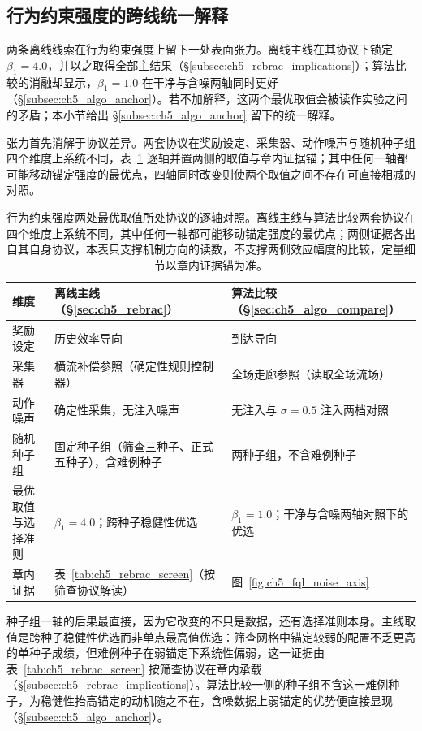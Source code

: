 \subsection{行为约束强度的跨线统一解释}\label{subsec:ch5_discussion_anchor}

两条离线线索在行为约束强度上留下一处表面张力。离线主线在其协议下锁定 $\beta_1=4.0$，并以之取得全部主结果（\S\ref{subsec:ch5_rebrac_implications}）；算法比较的消融却显示，$\beta_1=1.0$ 在干净与含噪两轴同时更好（\S\ref{subsec:ch5_algo_anchor}）。若不加解释，这两个最优取值会被读作实验之间的矛盾；本小节给出 \S\ref{subsec:ch5_algo_anchor} 留下的统一解释。

张力首先消解于协议差异。两套协议在奖励设定、采集器、动作噪声与随机种子组四个维度上系统不同，表~\ref{tab:ch5_discussion_beta_axes} 逐轴并置两侧的取值与章内证据锚；其中任何一轴都可能移动锚定强度的最优点，四轴同时改变则使两个取值之间不存在可直接相减的对照。

\begin{table}[t]
\centering
\caption{行为约束强度两处最优取值所处协议的逐轴对照。离线主线与算法比较两套协议在四个维度上系统不同，其中任何一轴都可能移动锚定强度的最优点；两侧证据各出自其自身协议，本表只支撑机制方向的读数，不支撑两侧效应幅度的比较，定量细节以章内证据锚为准。}
\label{tab:ch5_discussion_beta_axes}
\small
\setlength{\tabcolsep}{5pt}
\begin{tabular}{l p{47mm} p{52mm}}
\toprule
\textbf{维度} & \textbf{离线主线（\S\ref{sec:ch5_rebrac}）} & \textbf{算法比较（\S\ref{sec:ch5_algo_compare}）} \\
\midrule
奖励设定 & 历史效率导向 & 到达导向 \\
采集器 & 横流补偿参照（确定性规则控制器） & 全场走廊参照（读取全场流场） \\
动作噪声 & 确定性采集，无注入噪声 & 无注入与 $\sigma=0.5$ 注入两档对照 \\
随机种子组 & 固定种子组（筛查三种子、正式五种子），含难例种子 & 两种子组，不含难例种子 \\
最优取值与选择准则 & $\beta_1=4.0$；跨种子稳健性优选 & $\beta_1=1.0$；干净与含噪两轴对照下的优选 \\
章内证据 & 表~\ref{tab:ch5_rebrac_screen}（按筛查协议解读） & 图~\ref{fig:ch5_fql_noise_axis} \\
\bottomrule
\end{tabular}
\end{table}

种子组一轴的后果最直接，因为它改变的不只是数据，还有选择准则本身。主线取值是跨种子稳健性优选而非单点最高值优选：筛查网格中锚定较弱的配置不乏更高的单种子成绩，但难例种子在弱锚定下系统性偏弱，这一证据由表~\ref{tab:ch5_rebrac_screen} 按筛查协议在章内承载（\S\ref{subsec:ch5_rebrac_implications}）。算法比较一侧的种子组不含这一难例种子，为稳健性抬高锚定的动机随之不在，含噪数据上弱锚定的优势便直接显现（\S\ref{subsec:ch5_algo_anchor}）。

